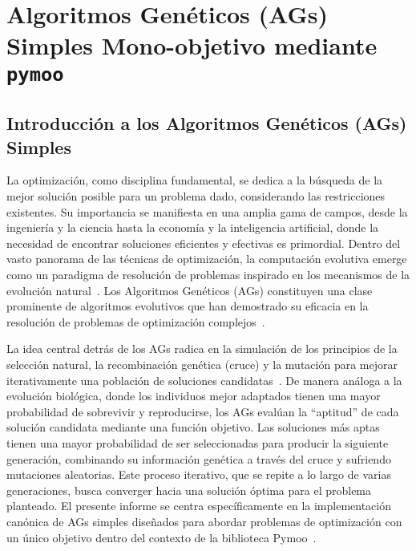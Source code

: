 \section[AGs Simples mediante \texttt{pymoo}]{Algoritmos Genéticos (AGs) Simples Mono-objetivo mediante \texttt{pymoo}}

\subsection{Introducción a los Algoritmos Genéticos (AGs) Simples}
La optimización, como disciplina fundamental, se dedica a la búsqueda de la mejor solución posible para un problema dado, considerando las restricciones existentes. Su importancia se manifiesta en una amplia gama de campos, desde la ingeniería y la ciencia hasta la economía y la inteligencia artificial, donde la necesidad de encontrar soluciones eficientes y efectivas es primordial. Dentro del vasto panorama de las técnicas de optimización, la computación evolutiva emerge como un paradigma de resolución de problemas inspirado en los mecanismos de la evolución natural~\cite{eiben2015}. Los Algoritmos Genéticos (AGs) constituyen una clase prominente de algoritmos evolutivos que han demostrado su eficacia en la resolución de problemas de optimización complejos~\cite{goldberg1989}.

La idea central detrás de los AGs radica en la simulación de los principios de la selección natural, la recombinación genética (cruce) y la mutación para mejorar iterativamente una población de soluciones candidatas~\cite{goldberg1989}. De manera análoga a la evolución biológica, donde los individuos mejor adaptados tienen una mayor probabilidad de sobrevivir y reproducirse, los AGs evalúan la ``aptitud'' de cada solución candidata mediante una función objetivo. Las soluciones más aptas tienen una mayor probabilidad de ser seleccionadas para producir la siguiente generación, combinando su información genética a través del cruce y sufriendo mutaciones aleatorias. Este proceso iterativo, que se repite a lo largo de varias generaciones, busca converger hacia una solución óptima para el problema planteado. El presente informe se centra específicamente en la implementación canónica de AGs simples diseñados para abordar problemas de optimización con un único objetivo dentro del contexto de la biblioteca Pymoo~\cite{blank2020}.

